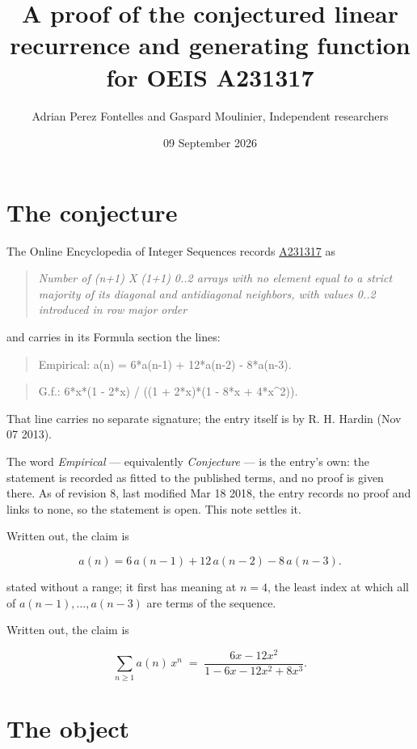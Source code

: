 \documentclass[11pt]{article}
\title{A proof of the conjectured linear recurrence and generating function for OEIS A231317}
\author{Adrian Perez Fontelles and Gaspard Moulinier, Independent researchers}
\date{09 September 2026}
\theoremstyle{definition}
\begin{document}
\maketitle
\section{The conjecture}

The Online Encyclopedia of Integer Sequences records \href{https://oeis.org/A231317}{A231317} as

\begin{quote}\itshape Number of (n+1) X (1+1) 0..2 arrays with no element equal to a strict majority of its diagonal and antidiagonal neighbors, with values 0..2 introduced in row major order\end{quote}

and carries in its Formula section the lines:

\begin{quote}\ttfamily Empirical: a(n) = 6*a(n-1) + 12*a(n-2) - 8*a(n-3).\end{quote}

\begin{quote}\ttfamily G.f.: 6*x*(1 - 2*x) / ((1 + 2*x)*(1 - 8*x + 4*x\textasciicircum{}2)).\end{quote}

That line carries no separate signature; the entry itself is by R. H. Hardin (Nov 07 2013).

The word {\itshape Empirical} --- equivalently {\itshape Conjecture} --- is the entry's own: the statement is recorded as fitted to the published terms, and no proof is given there. As of revision 8, last modified Mar 18 2018, the entry records no proof and links to none, so the statement is open. This note settles it.

Written out, the claim is

\[a(n) = 6\,a(n-1) + 12\,a(n-2) - 8\,a(n-3).\]

stated without a range; it first has meaning at $n = 4$, the least index at which all of $a(n-1),\dots,a(n-3)$ are terms of the sequence.

Written out, the claim is

\[\sum_{n \ge 1} a(n)\,x^n \;=\; \frac{6x - 12x^{2}}{1 - 6x - 12x^{2} + 8x^{3}}.\]

\section{The object}
\end{document}
